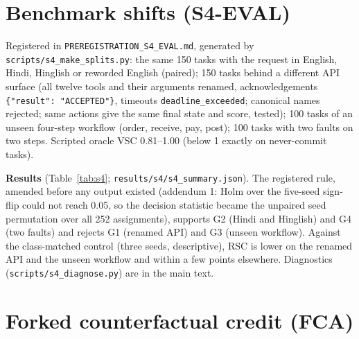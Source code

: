 \section{Benchmark shifts (S4-EVAL)}
\label{app:shift}

Registered in \texttt{PREREGISTRATION\_S4\_EVAL.md}, generated by \texttt{scripts/s4\_make\_splits.py}: the same 150 tasks with the request in English, Hindi, Hinglish or reworded English (paired); 150 tasks behind a different API surface (all twelve tools and their arguments renamed, acknowledgements \texttt{\{"result": "ACCEPTED"\}}, timeouts \texttt{deadline\_exceeded}; canonical names rejected; same actions give the same final state and score, tested); 100 tasks of an unseen four-step workflow (order, receive, pay, post); 100 tasks with two faults on two steps. Scripted oracle VSC 0.81--1.00 (below 1 exactly on never-commit tasks).

\textbf{Results} (Table~\ref{tab:s4}; \texttt{results/s4/s4\_summary.json}). The registered rule, amended before any output existed (addendum 1: Holm over the five-seed sign-flip could not reach 0.05, so the decision statistic became the unpaired seed permutation over all 252 assignments), supports G2 (Hindi and Hinglish) and G4 (two faults) and rejects G1 (renamed API) and G3 (unseen workflow). Against the class-matched control (three seeds, descriptive), RSC is lower on the renamed API and the unseen workflow and within a few points elsewhere. Diagnostics (\texttt{scripts/s4\_diagnose.py}) are in the main text.

\begin{table}[h]
\centering
\resizebox{\columnwidth}{!}{}
\caption{S4-EVAL: mean VSC per arm (5, 5 and 3 runs) and the registered RSC $-$ \RV{} contrast (seed-averaged paired task bootstrap).}
\label{tab:s4}
\end{table}

\section{Forked counterfactual credit (FCA)}
\label{app:fca}

